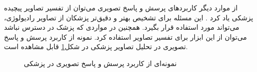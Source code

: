 از موارد دیگر کاربرد‌های پرسش و پاسخ تصویری می‌توان از تفسیر تصاویر پیچیده پزشکی یاد کرد \cite{ImageCLEFVQA-Med2019}. این مسئله برای تشخیص بهتر و دقیق‌تر پزشکان از تصاویر رادیولوژی، می‌تواند مورد استفاده قرار بگیرد. همچنین در مواردی که پزشک در دسترس نباشد می‌توان از این ابزار برای تفسیر تصاویر استفاده کرد. نمونه از کاربرد پرسش و پاسخ تصویری در تحلیل تصاویر پزشکی در شکل\ref{vqa-med} قابل مشاهده است.
\begin{figure}[H]
	\caption{نمونه‌ای از کاربرد پرسش و پاسخ تصویری در پزشکی
		\cite{ImageCLEFVQA-Med2019}}
	\label{vqa-med}
\end{figure}

